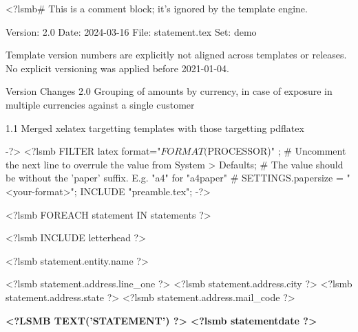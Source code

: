<?lsmb#   This is a comment block; it's ignored by the template engine.

   Version:  2.0
   Date:     2024-03-16
   File:     statement.tex
   Set:      demo

Template version numbers are explicitly not aligned across templates or
releases. No explicit versioning was applied before 2021-01-04.

Version   Changes
2.0       Grouping of amounts by currency, in case of
          exposure in multiple currencies against a single customer

1.1       Merged xelatex targetting templates with those targetting pdflatex

-?>
<?lsmb FILTER latex { format="$FORMAT($PROCESSOR)" };
       # Uncomment the next line to overrule the value from System > Defaults;
       # The value should be without the 'paper' suffix. E.g. "a4" for "a4paper"
       # SETTINGS.papersize = "<your-format>";
       INCLUDE "preamble.tex"; -?>



<?lsmb FOREACH statement IN statements ?>
\pagestyle{myheadings}
\thispagestyle{empty}

\ifpdftex
  \fontsize{10pt}{12pt}\selectfont
\fi

<?lsmb INCLUDE letterhead ?>

\parbox[t]{.5\textwidth}{
<?lsmb statement.entity.name ?>

<?lsmb statement.address.line_one ?>
<?lsmb statement.address.city ?> <?lsmb statement.address.state ?>
<?lsmb statement.address.mail_code ?>
}
\hfill

\vspace{1cm}

\textbf{\MakeUppercase{<?lsmb text('Statement') ?>}} \hfill
\textbf{<?lsmb statementdate ?>}

\vspace{2cm}

